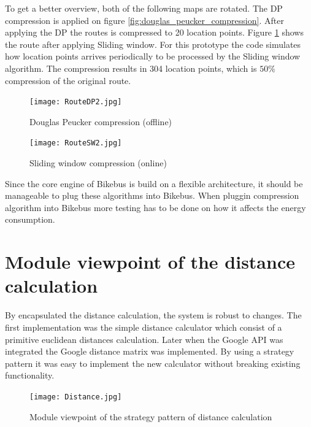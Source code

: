 To get a better overview, both of the following maps are rotated. The DP compression is applied on figure \ref{fig:douglas_peucker_compression}. After applying the DP the routes is compressed to 20 location points. Figure \ref{fig:sliding_window} shows the route after applying Sliding window. For this prototype the code simulates how location points arrives periodically to be processed by the Sliding window algorithm. The compression results in 304 location points, which is $50\%$ compression of the original route.

\begin{figure}[H]
\centering
\begin{minipage}{0.50\textwidth}
\centering
    \texttt{[image: RouteDP2.jpg]}
    \caption{Douglas Peucker compression (offline)}
    \label{fig:douglas_peucker_compression}
\end{minipage}\hfill
\begin{minipage}{0.50\textwidth}
\centering
    \texttt{[image: RouteSW2.jpg]}
    \caption{Sliding window compression (online)}
    \label{fig:sliding_window}
\end{minipage}
\end{figure}

Since the core engine of Bikebus is build on a flexible architecture, it should be manageable to plug these algorithms into Bikebus. When pluggin compression algorithm into Bikebus more testing has to be done on how it affects the energy consumption. 

\section{Module viewpoint of the distance calculation}
By encapsulated the distance calculation, the system is robust to changes. The first implementation was the simple distance calculator which consist of a primitive euclidean distances calculation. Later when the Google API was integrated the Google distance matrix was implemented. By using a strategy pattern \cite{Baerbak10} it was easy to implement the new calculator without breaking existing functionality. 

\begin{figure}[H]
\centering
\texttt{[image: Distance.jpg]}
\caption{Module viewpoint of the strategy pattern of distance calculation}
\label{fig:module_view_distance_calculation}
\end{figure}

